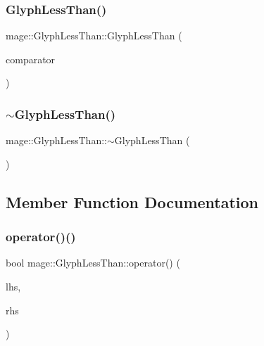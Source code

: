 \subsubsection{\texorpdfstring{Glyph\+Less\+Than()}{GlyphLessThan()}\hspace{0.1cm}{\footnotesize\ttfamily [3/3]}}
{\footnotesize\ttfamily mage\+::\+Glyph\+Less\+Than\+::\+Glyph\+Less\+Than (\begin{DoxyParamCaption}\item[{\hyperlink{structmage_1_1_glyph_less_than}{Glyph\+Less\+Than} \&\&}]{comparator }\end{DoxyParamCaption})\hspace{0.3cm}{\ttfamily [default]}}

\hypertarget{structmage_1_1_glyph_less_than_ace50804a419a31b0413566b5aba2eeac}{}\label{structmage_1_1_glyph_less_than_ace50804a419a31b0413566b5aba2eeac} 
\subsubsection{\texorpdfstring{$\sim$\+Glyph\+Less\+Than()}{~GlyphLessThan()}}
{\footnotesize\ttfamily mage\+::\+Glyph\+Less\+Than\+::$\sim$\+Glyph\+Less\+Than (\begin{DoxyParamCaption}{ }\end{DoxyParamCaption})\hspace{0.3cm}{\ttfamily [default]}}



\subsection{Member Function Documentation}
\hypertarget{structmage_1_1_glyph_less_than_a909ab77ec919121f782655a6f9898c1a}{}\label{structmage_1_1_glyph_less_than_a909ab77ec919121f782655a6f9898c1a} 
\subsubsection{\texorpdfstring{operator()()}{operator()()}\hspace{0.1cm}{\footnotesize\ttfamily [1/3]}}
{\footnotesize\ttfamily bool mage\+::\+Glyph\+Less\+Than\+::operator() (\begin{DoxyParamCaption}\item[{const \hyperlink{structmage_1_1_glyph}{Glyph} \&}]{lhs,  }\item[{const \hyperlink{structmage_1_1_glyph}{Glyph} \&}]{rhs }\end{DoxyParamCaption})}

